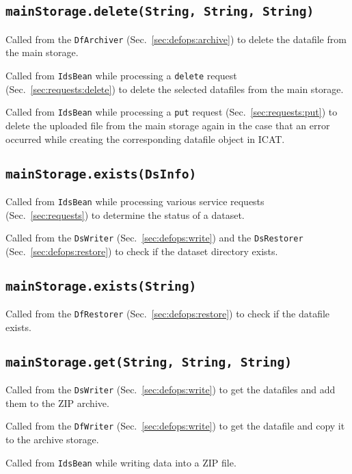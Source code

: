 \documentclass[paper=a4]{scrartcl}
\begin{document}
\subsection{\texttt{mainStorage.delete(String, String, String)}}

Called from the \texttt{DfArchiver} (Sec.\ \ref{sec:defops:archive})
to delete the datafile from the main storage.

Called from \texttt{IdsBean} while processing a \texttt{delete}
request (Sec.\ \ref{sec:requests:delete}) to delete the selected
datafiles from the main storage.

Called from \texttt{IdsBean} while processing a \texttt{put} request
(Sec.\ \ref{sec:requests:put}) to delete the uploaded file from the
main storage again in the case that an error occurred while creating
the corresponding datafile object in ICAT.

\subsection{\texttt{mainStorage.exists(DsInfo)}}

Called from \texttt{IdsBean} while processing various service requests
(Sec.\ \ref{sec:requests}) to determine the status of a dataset.

Called from the \texttt{DsWriter} (Sec.\ \ref{sec:defops:write}) and
the \texttt{DsRestorer} (Sec.\ \ref{sec:defops:restore}) to check if
the dataset directory exists.

\subsection{\texttt{mainStorage.exists(String)}}

Called from the \texttt{DfRestorer} (Sec.\ \ref{sec:defops:restore})
to check if the datafile exists.

\subsection{\texttt{mainStorage.get(String, String, String)}}

Called from the \texttt{DsWriter} (Sec.\ \ref{sec:defops:write}) to
get the datafiles and add them to the ZIP archive.

Called from the \texttt{DfWriter} (Sec.\ \ref{sec:defops:write}) to
get the datafile and copy it to the archive storage.

Called from \texttt{IdsBean} while writing data into a ZIP file.
\end{document}

